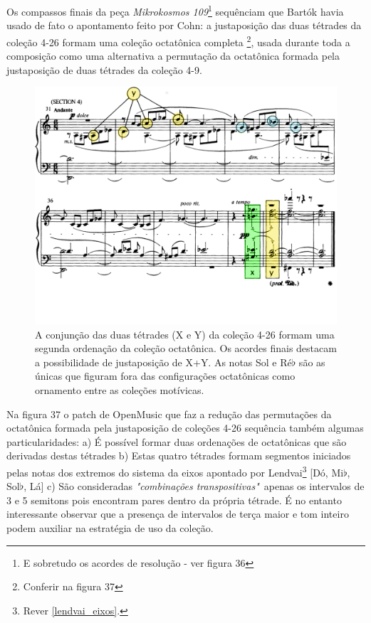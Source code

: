 \documentclass[
	12pt,				%
	openright,			%
	twoside,			%
	a4paper,			%
	english,			%
	french,				%
	spanish,			%
	brazil				%
	]{abntex2}
\begin{document}
Os compassos finais da peça \textit{Mikrokosmos 109}\footnote{E sobretudo os acordes de resolução - ver figura 36} sequênciam que Bartók havia usado de fato o apontamento feito por Cohn: a justaposição das duas tétrades da coleção 4-26 formam uma coleção octatônica completa \footnote{Conferir na figura 37}, usada durante toda a composição como uma alternativa a permutação da octatônica formada pela justaposição de duas tétrades da coleção 4-9. 

\begin{figure}[!h]
	\caption{\label{fig_grafico} A conjunção das duas tétrades (X e Y) da coleção 4-26 formam uma segunda ordenação da coleção octatônica. Os acordes finais destacam a possibilidade de justaposição de X+Y. As notas Sol e Ré$\flat$ são as únicas que figuram fora das configurações octatônicas como ornamento entre as coleções motívicas.  }
	\begin{center}
	    \includegraphics[scale=0.3]{octa/mikro_Bali02.png}
	\end{center}
\end{figure}

Na figura 37 o patch de OpenMusic que faz a redução das permutações da octatônica formada pela justaposição de coleções 4-26 sequência também algumas particularidades: a) É possível formar duas ordenações de octatônicas que são derivadas destas tétrades b) Estas quatro tétrades formam segmentos iniciados pelas notas dos extremos do sistema da eixos apontado por Lendvai\footnote{Rever \autoref{lendvai_eixos}. } [Dó, Mi$\flat$, Sol$\flat$, Lá] c) São consideradas \textit{"combinações transpositivas"}\ apenas os intervalos de 3 e 5 semitons pois encontram pares dentro da própria tétrade. É no entanto interessante observar que a presença de intervalos de terça maior e tom inteiro podem auxiliar na estratégia de uso da coleção.
\end{document}

